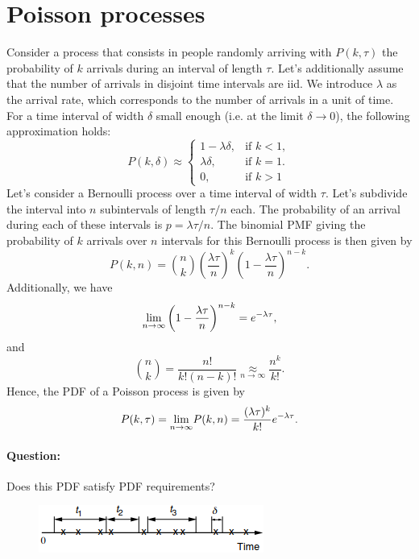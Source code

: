 \documentclass[12pt,a4paper]{article}
\begin{document}
\section{Poisson processes}
Consider a process that consists in people randomly arriving with $P(k,\tau)$ the probability of $k$ arrivals during an interval of length $\tau$.
Let's additionally assume that the number of arrivals in disjoint time intervals are iid.
We introduce $\lambda$ as the arrival rate, which corresponds to the number of arrivals in a unit of time. 
For a time interval of width $\delta$ small enough (i.e. at the limit $\delta\rightarrow 0$), the following approximation holds:
\begin{equation}
	P(k,\delta) \approx
	\begin{cases}
		1-\lambda\delta, & \text{if } k<1, \\
		\lambda\delta, & \text{if } k=1.\\
		0, & \text{if } k>1
	\end{cases}
\end{equation}
Let's consider a Bernoulli process over a time interval of width $\tau$.
Let's subdivide the interval into $n$ subintervals of length $\tau/n$ each. The probability of an arrival during each of these intervals is $p = \lambda \tau/n$.
The binomial PMF giving the probability of $k$ arrivals over $n$ intervals for this Bernoulli process is then given by
\begin{equation}
	P(k,n) = \binom{n}{k}\left(\frac{\lambda\tau}{n}\right)^k \left(1-\frac{\lambda\tau}{n}\right)^{n-k}.
\end{equation}
Additionally, we have 
\begin{equation}
	\underset{n\rightarrow\infty}{\rm lim}\left(1-\frac{\lambda\tau}{n}\right)^{n-k} = e^{-\lambda\tau},
\end{equation}
and
$$
\binom{n}{k} = \frac{n!}{k!{(n-k)}!}\underset{n\rightarrow\infty}{\approx} \frac{n^k}{k!}.
$$
Hence, the PDF of a Poisson process is given by 
\begin{equation}
P(k,\tau) =	\underset{n\rightarrow\infty}{\rm lim}P(k,n) = \frac{(\lambda\tau)^k}{k!}e^{-\lambda\tau}.
\end{equation}
\paragraph{Question:} Does this PDF satisfy PDF requirements?
\begin{figure}
	\begin{center}
		\includegraphics{images/poisson.png}
	\end{center}
\end{figure}
\end{document}
